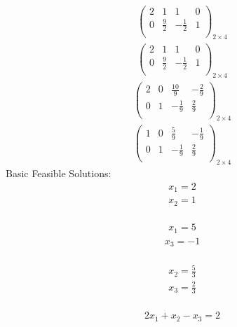 \documentclass{article}
\begin{document}
\begin{align*}
\left(
\begin{array}{cc|cc}
2 & 1 & 1 & 0\\
0 & \frac{9}{2} & -\frac{1}{2} & 1\\
\end{array}
\right)_{2\times 4}
\end{align*}
\begin{align*}
\left(
\begin{array}{cc|cc}
2 & 1 & 1 & 0\\
0 & \frac{9}{2} & -\frac{1}{2} & 1\\
\end{array}
\right)_{2\times 4}
\end{align*}
\begin{align*}
\left(
\begin{array}{cc|cc}
2 & 0 & \frac{10}{9} & -\frac{2}{9}\\
0 & 1 & -\frac{1}{9} & \frac{2}{9}\\
\end{array}
\right)_{2\times 4}
\end{align*}
\begin{align*}
\left(
\begin{array}{cc|cc}
1 & 0 & \frac{5}{9} & -\frac{1}{9}\\
0 & 1 & -\frac{1}{9} & \frac{2}{9}\\
\end{array}
\right)_{2\times 4}
\end{align*}
Basic Feasible Solutions:\\
\begin{align*}
x_{1}=2\end{align*}
  \begin{align*}
x_{2}=1\end{align*}
  \\
\begin{align*}
x_{1}=5\end{align*}
  \begin{align*}
x_{3}=-1\end{align*}
  \\
\begin{align*}
x_{2}=\frac{5}{3}\end{align*}
  \begin{align*}
x_{3}=\frac{2}{3}\end{align*}
  \\
\begin{align*}
2x_{1} + x_{2} - x_{3}=2\end{align*}
\end{document}
